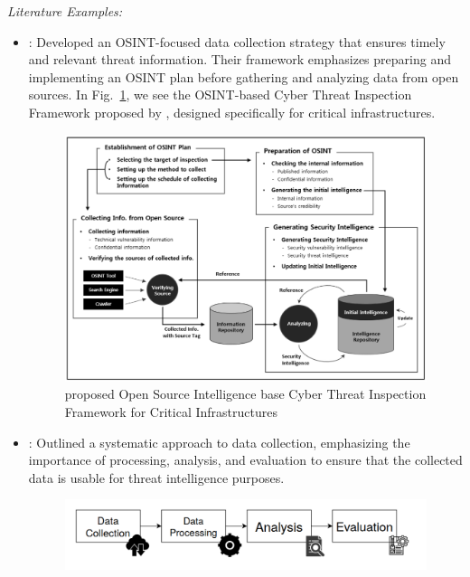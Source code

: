 \documentclass[a4paper,twoside,12pt]{report}
\begin{document}
\textit{Literature Examples:}
\begin{itemize}
    \item \citep{lee2016open}: Developed an OSINT-focused data collection strategy that ensures timely and relevant threat information. Their framework emphasizes preparing and implementing an OSINT plan before gathering and analyzing data from open sources. In Fig.~\ref{fig:thing1}, we see the OSINT-based Cyber Threat Inspection Framework proposed by \cite{lee2016open}, designed specifically for critical infrastructures.
    \begin{figure}[ht]
        \centering
        \includegraphics[width=1.0\linewidth]{images/osint-based-cti-framwork.png}  %
        \caption{\citep{lee2016open} proposed Open Source Intelligence base Cyber Threat Inspection Framework for Critical Infrastructures}
        \label{fig:thing1}
    \end{figure}
    \item \citep{ryandy2020xt}: Outlined a systematic approach to data collection, emphasizing the importance of processing, analysis, and evaluation to ensure that the collected data is usable for threat intelligence purposes.
    \begin{figure}[ht]
        \centering
        \includegraphics[width=1.0\linewidth]{images/data-collection-for-osint.png}  %

\end{figure}
\end{itemize}
\end{document}

